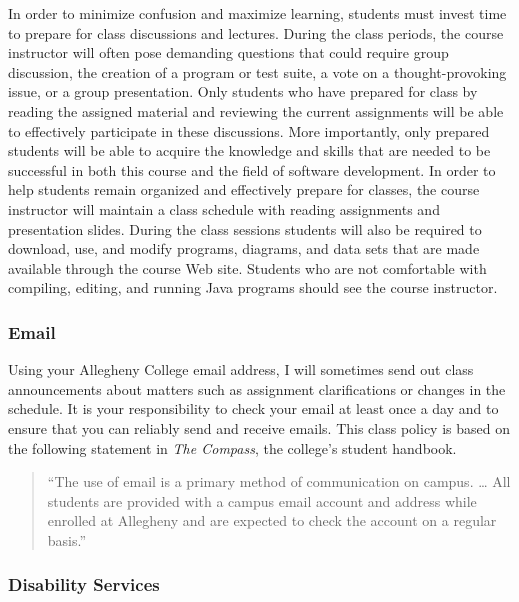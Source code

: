In order to minimize confusion and maximize learning, students must invest time to prepare for class discussions and
lectures.  During the class periods, the course instructor will often pose demanding questions that could require group
discussion, the creation of a program or test suite, a vote on a thought-provoking issue, or a group presentation.
Only students who have prepared for class by reading the assigned material and reviewing the current assignments will be
able to effectively participate in these discussions.  More importantly, only prepared students will be able to acquire
the knowledge and skills that are needed to be successful in both this course and the field of software development.  In
order to help students remain organized and effectively prepare for classes, the course instructor will maintain a class
schedule with reading assignments and presentation slides.   During the class sessions students will also be required to
download, use, and modify programs, diagrams, and data sets that are made available through the course Web site.
Students who are not comfortable with compiling, editing, and running Java programs should see the course instructor.

\subsubsection*{Email}

Using your Allegheny College email address, I will sometimes send out class announcements about matters such as
assignment clarifications or changes in the schedule. It is your responsibility to check your email at least once a day
and to ensure that you can reliably send and receive emails. This class policy is based on the following statement in
{\em The Compass}, the college's student handbook.

\vspace*{-.1in}
\begin{quote}
``The use of email is a primary method of communication on campus. \ldots
All students are provided with a campus email account and address while
enrolled at Allegheny and are expected to check the account on a regular
basis.'' 
\end{quote}
\vspace*{-.15in}

\subsubsection*{Disability Services}

